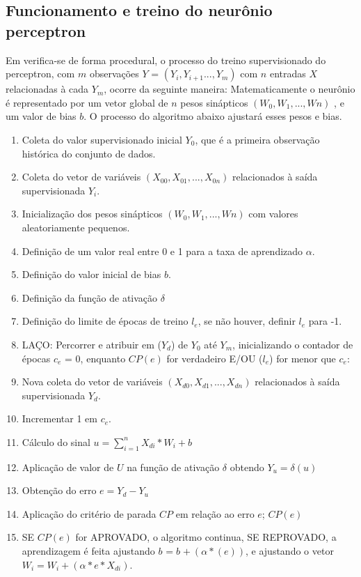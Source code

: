 \documentclass[	12pt, Times, openright, twoside, a4paper, english, brazil]{abntex2}
\begin{document}
          \subsection {Funcionamento e treino do neurônio perceptron}
            Em \cite{Almeida2013} verifica-se de forma procedural, o processo do treino supervisionado do perceptron, com $m$ observações $Y$ = $(Y_{i},Y_{i+1}...,Y_{m})$ com $n$ entradas $X$ relacionadas à cada $Y_m$, ocorre da seguinte maneira: 
            Matematicamente o neurônio é representado por um vetor global de $n$ pesos sinápticos $(W_0, W_{1}, ..., W{n})$ , e um valor de bias $b$. O processo do algoritmo abaixo ajustará esses pesos e bias.
            \begin{enumerate}
              \item Coleta do valor supervisionado inicial $Y_{0}$, que é a primeira observação histórica do conjunto de dados.
              \item Coleta do vetor de variáveis $(X_{00}, X_{01}, ..., X_{0n})$ relacionados à saída supervisionada $Y_i$.
              \item Inicialização dos pesos sinápticos $(W_0, W_{1}, ..., W{n})$ com valores aleatoriamente pequenos.
              \item Definição de um valor real entre 0 e 1 para a taxa de aprendizado $\alpha$.
              \item Definição do valor inicial de bias $b$.
              \item Definição da função de ativação $\delta$ 
              \item Definição do limite de épocas de treino $l_e$, se não houver, definir $l_e$ para -1.
              \item LAÇO: Percorrer e atribuir em ($Y_d$) de $Y_0$ até $Y_m$, inicializando o contador de épocas $c_e$ = 0, enquanto $CP(e)$ for verdadeiro E/OU ($l_e$) for menor que $c_e$:
              \item Nova coleta do vetor de variáveis $(X_{d0}, X_{d1}, ..., X_{dn})$ relacionados à saída supervisionada $Y_d$.
              \item Incrementar 1 em $c_e$.
              \item Cálculo do sinal $u = \sum_{i=1}^{n}X_{di}*W_{i}+b$
              \item Aplicação de valor de $U$ na função de ativação $\delta$ obtendo $Y_u = \delta(u)$
              \item Obtenção do erro $e = Y_d-Y_u$
              \item Aplicação do critério de parada $CP$ em relação ao erro $e$; $CP(e)$
              \item SE $CP(e)$ for APROVADO, o algoritmo continua, SE REPROVADO, a aprendizagem é feita ajustando $b_{}=b_{}+(\alpha*(e))$, e ajustando o vetor $W_{i} = W_{i}+(\alpha*e*X_{di})$. 
            \end{enumerate}
 
\end{document}
